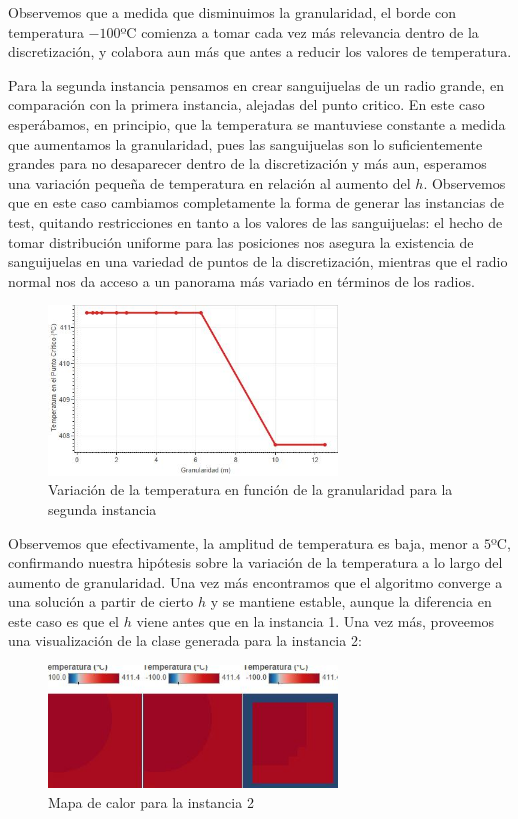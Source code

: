 Observemos que a medida que disminuimos la granularidad, el borde con temperatura $-100$ºC comienza a tomar cada vez más relevancia dentro de la discretización, y colabora aun más que antes a reducir los valores de temperatura.

Para la segunda instancia pensamos en crear sanguijuelas de un radio grande, en comparación con la primera instancia, alejadas del punto critico. En este caso esperábamos, en principio, que la temperatura se mantuviese constante a medida que aumentamos la granularidad, pues las sanguijuelas son lo suficientemente grandes para no desaparecer dentro de la discretización y más aun, esperamos una variación pequeña de temperatura en relación al aumento del $h$. Observemos que en este caso cambiamos completamente la forma de generar las instancias de test, quitando restricciones en tanto a los valores de las sanguijuelas: el hecho de tomar distribución uniforme para las posiciones nos asegura la existencia de sanguijuelas en una variedad de puntos de la discretización, mientras que el radio normal nos da acceso a un panorama más variado en términos de los radios.

\begin{figure}[h]
    \centering
    \includegraphics[width=0.685\textwidth]{experimento 1-2}
    \caption{Variación de la temperatura en función de la granularidad para la segunda instancia}
    \label{fig:exp12}
\end{figure}

Observemos que efectivamente, la amplitud de temperatura es baja, menor a $5$ºC, confirmando nuestra hipótesis sobre la variación de la temperatura a lo largo del aumento de granularidad. Una vez más encontramos que el algoritmo converge a una solución a partir de cierto $h$ y se mantiene estable, aunque la diferencia en este caso es que el $h$ viene antes que en la instancia 1. Una vez más, proveemos una visualización de la clase generada para la instancia 2:

\begin{figure}[h]
    \centering
    \includegraphics[width=0.685\textwidth]{Ejemplo Instancia 2}
    \caption{Mapa de calor para la instancia 2}
    \label{fig:exp12-vis}
\end{figure}

